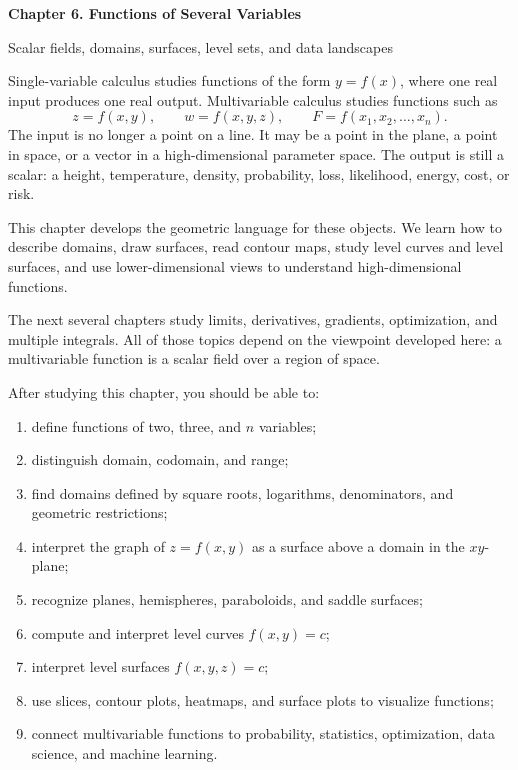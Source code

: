 \documentclass[11pt]{article}
\begin{document}
\begin{center}
  {\LARGE\bfseries Chapter 6. Functions of Several Variables\par}
  \vspace{0.3em}
  {\large Scalar fields, domains, surfaces, level sets, and data landscapes\par}
\end{center}

\begin{chapteroverviewbox}
Single-variable calculus studies functions of the form $y=f(x)$, where one real input produces one real output. Multivariable calculus studies functions such as
\[
z=f(x,y), \qquad w=f(x,y,z), \qquad F=f(x_1,x_2,\ldots,x_n).
\]
The input is no longer a point on a line. It may be a point in the plane, a point in space, or a vector in a high-dimensional parameter space. The output is still a scalar: a height, temperature, density, probability, loss, likelihood, energy, cost, or risk.

This chapter develops the geometric language for these objects. We learn how to describe domains, draw surfaces, read contour maps, study level curves and level surfaces, and use lower-dimensional views to understand high-dimensional functions.
\end{chapteroverviewbox}

\begin{notebox}
The next several chapters study limits, derivatives, gradients, optimization, and multiple integrals. All of those topics depend on the viewpoint developed here: a multivariable function is a scalar field over a region of space.
\end{notebox}

\begin{goalbox}
After studying this chapter, you should be able to:
\begin{enumerate}
  \item define functions of two, three, and $n$ variables;
  \item distinguish domain, codomain, and range;
  \item find domains defined by square roots, logarithms, denominators, and geometric restrictions;
  \item interpret the graph of $z=f(x,y)$ as a surface above a domain in the $xy$-plane;
  \item recognize planes, hemispheres, paraboloids, and saddle surfaces;
  \item compute and interpret level curves $f(x,y)=c$;
  \item interpret level surfaces $f(x,y,z)=c$;
  \item use slices, contour plots, heatmaps, and surface plots to visualize functions;
  \item connect multivariable functions to probability, statistics, optimization, data science, and machine learning.
\end{enumerate}
\end{goalbox}
\end{document}
